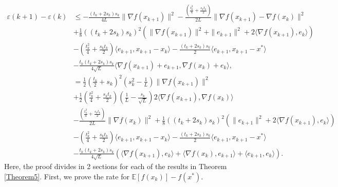 \documentclass{article}
\theoremstyle{plain}
\theoremstyle{definition}
\theoremstyle{remark}
\begin{document}
        \begin{align}\label{Lyap_stc_6}
            \varepsilon(k+1)-\varepsilon(k)&\leq -\frac{(t_k+2s_k)s_k}{4L} \|\nabla f(x_{k+1})\|^2-\frac{(\frac{t_{k}^2}{4}+\frac{s_{k}t_{k}}{2})}{2L}\|\nabla f(x_{k+1})-\nabla f(x_k)\|^2\nonumber\\
            &+\frac{1}{8}((t_k+2s_k)s_k)^2(\|\nabla f(x_{k+1})\|^2+\|e_{k+1}\|^2+2\langle \nabla f(x_{k+1}) ,e_k \rangle) \nonumber\\
            & -(\frac{t_k^2}{4}+\frac{s_kt_k}{2})\langle e_{k+1},x_{k+1}-x_k\rangle-\frac{(t_k+2s_k)s_k}{2}\langle e_{k+1},x_{k+1}-x^*\rangle\nonumber\\
         & -\frac{t_k(t_k+2s_k)s_k}{4\sqrt{L}}\langle \nabla f(x_{k+1})+e_{k+1}, \nabla f(x_k)+e_k \rangle,\nonumber\\
         &=\frac{1}{2}\left(\frac{t_k}{2}+s_k\right)^2(s_k^2-\frac{1}{L})\|\nabla f(x_{k+1})\|^2\nonumber\\
         &+\frac{1}{2}\left(\frac{t_k^2}{4}+\frac{s_kt_k}{2} \right)(\frac{1}{L}-\frac{s_k}{\sqrt{L}}) 2\langle \nabla f(x_{k+1}),\nabla f(x_k) \rangle\nonumber\\
         &-\frac{(\frac{t_{k}^2}{4}+\frac{s_{k}t_{k}}{2})}{2L}\|\nabla f(x_k)\|^2+\frac{1}{8}((t_k+2s_k)s_k)^2(\|e_{k+1}\|^2+2\langle \nabla f(x_{k+1}) ,e_k \rangle)\nonumber\\
         & -(\frac{t_k^2}{4}+\frac{s_kt_k}{2})\langle e_{k+1},x_{k+1}-x_k\rangle-\frac{(t_k+2s_k)s_k}{2}\langle e_{k+1},x_{k+1}-x^*\rangle\nonumber\\
         &-\frac{t_k(t_k+2s_k)s_k}{4\sqrt{L}}\left(\langle \nabla f(x_{k+1}),e_k \rangle+\langle \nabla f(x_{k}) , e_{k+1}\rangle+\langle e_{k+1},e_k\rangle\right).
        \end{align}
        Here, the proof divides in 2 sections for each of the results in Theorem \ref{Theorem5}. First, we prove the rate for $\mathbb E\left[f(x_k)\right]-f(x^*)$. 
        
\end{document}
